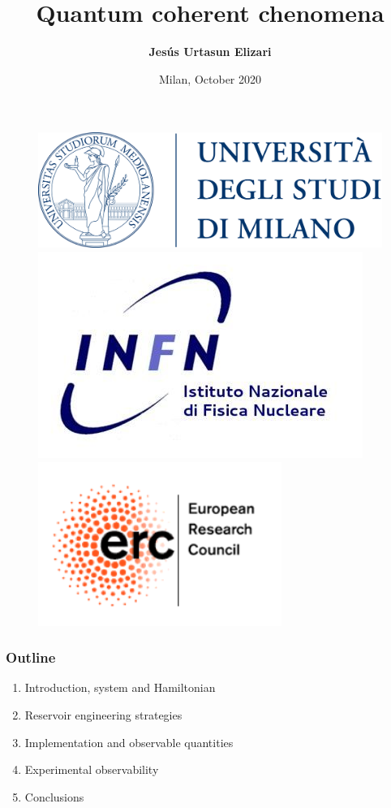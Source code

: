 \documentclass[aspectratio=43]{beamer}
\title[Quantum coherent phenomena]{Quantum coherent chenomena}
\author{\textbf {Jes\'us Urtasun Elizari}}
\date{Milan, October 2020}
\begin{document}
\begin{frame}

	\vspace{1.0 cm}
	
	
	\vspace{0.25 cm}

	\begin{figure}
		\includegraphics[width = 3.0 cm]{plots/logo_unimi.png}
		\hfill
		\includegraphics[width = 3.0 cm]{plots/logo_infn.png}
		\hfill
		\includegraphics[width = 3.0 cm]{plots/logo_erc.png}
		\endminipage
	\end{figure}

	\vspace{1.0 cm}

\end{frame}

\begin{frame}

	\frametitle{Outline}
	
	\begin{enumerate}
		\item {\color{blue}Introduction, system and Hamiltonian}
		\item {\color{blue}Reservoir engineering strategies}
		\item {\color{blue}Implementation and observable quantities}
		\item {\color{blue}Experimental observability}
		\item {\color{blue}Conclusions}
	\end{enumerate}
	
\end{frame}
\end{document}
